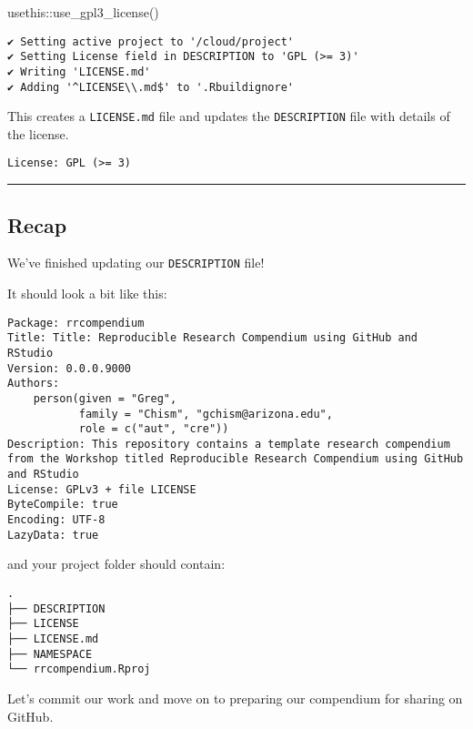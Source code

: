 \documentclass[
  letterpaper,
  DIV=11,
  numbers=noendperiod]{scrreprt}
\newenvironment{Shaded}{\begin{snugshade}}{\end{snugshade}}
\newcommand{\FunctionTok}[1]{\textcolor[rgb]{0.28,0.35,0.67}{#1}}
\newcommand{\NormalTok}[1]{\textcolor[rgb]{0.00,0.23,0.31}{#1}}
\newcommand{\SpecialCharTok}[1]{\textcolor[rgb]{0.37,0.37,0.37}{#1}}
\begin{document}
\begin{Shaded}
\begin{Highlighting}[]
\NormalTok{ usethis}\SpecialCharTok{::}\FunctionTok{use\_gpl3\_license}\NormalTok{()}
\end{Highlighting}
\end{Shaded}

\begin{verbatim}
✔ Setting active project to '/cloud/project'
✔ Setting License field in DESCRIPTION to 'GPL (>= 3)'
✔ Writing 'LICENSE.md'
✔ Adding '^LICENSE\\.md$' to '.Rbuildignore'
\end{verbatim}

This creates a \texttt{LICENSE.md} file and updates the
\texttt{DESCRIPTION} file with details of the license.

\begin{verbatim}
License: GPL (>= 3)
\end{verbatim}

\begin{center}\rule{0.5\linewidth}{0.5pt}\end{center}

\hypertarget{recap}{%
\subsection{Recap}\label{recap}}

We've finished updating our \texttt{DESCRIPTION} file! 🎉

It should look a bit like this:

\begin{verbatim}
Package: rrcompendium
Title: Title: Reproducible Research Compendium using GitHub and RStudio
Version: 0.0.0.9000
Authors:
    person(given = "Greg",
           family = "Chism", "gchism@arizona.edu", 
           role = c("aut", "cre"))
Description: This repository contains a template research compendium from the Workshop titled Reproducible Research Compendium using GitHub and RStudio
License: GPLv3 + file LICENSE
ByteCompile: true
Encoding: UTF-8
LazyData: true
\end{verbatim}

and your project folder should contain:

\begin{verbatim}
.
├── DESCRIPTION
├── LICENSE
├── LICENSE.md
├── NAMESPACE
└── rrcompendium.Rproj
\end{verbatim}

Let's commit our work and move on to preparing our compendium for
sharing on GitHub.
\end{document}
